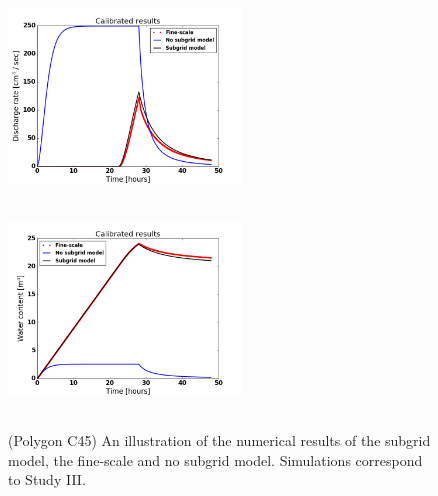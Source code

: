 \documentclass[review,11pt]{elsarticle}
\begin{document}
\begin{figure}[!h]
\centering
\includegraphics[width=6.2cm, height=5.5cm]{./figures/POLYGON45/POLYGON45dischargeCalibDDManning.png}
\includegraphics[width=6.2cm, height=5.5cm]{./figures/POLYGON45/POLYGON45watercontentCalibDDManning.png}
\caption{(Polygon C45) An illustration of the numerical results of the subgrid model, the fine-scale and no subgrid model. Simulations correspond to Study III.}
\label{polygon-C45}
\end{figure}
\end{document}
